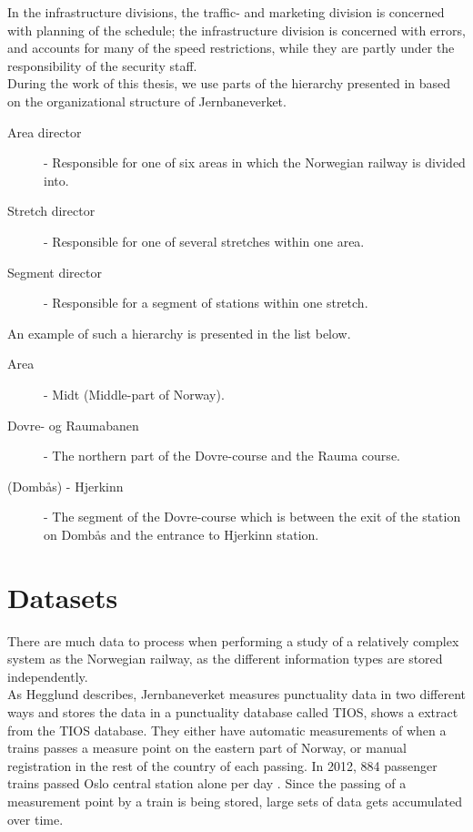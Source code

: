 In the infrastructure divisions, the traffic- and marketing division is
concerned with planning of the schedule; the infrastructure division is
concerned with errors, and accounts for many of the speed restrictions, while
they are partly under the responsibility of the security staff.\\


During the work of this thesis, we use parts of the hierarchy presented in 
 based on the organizational structure of Jernbaneverket.
\begin{description}
	\item [Area director] - Responsible for one of six areas in which the 
	Norwegian railway is divided into.
	\item [Stretch director] - Responsible for one of several stretches within 
	one area.
	\item [Segment director] - Responsible for a segment of stations within one stretch.
\end{description}

\bigskip\bigskip\bigskip
An example of such a hierarchy is presented in the list below.

\begin{description}
	\item [Area] - Midt (Middle-part of Norway).
	\item [Dovre- og Raumabanen] - The northern part of the Dovre-course and the
	Rauma course.
	\item [(Dombås) - Hjerkinn] - The segment of the Dovre-course which is 
	between the exit of the station on Dombås and the entrance to Hjerkinn
	station.
\end{description}


\section{Datasets} %
\label{sec:back_data_sets}
There are much data to process when performing a study of a relatively complex 
system as the Norwegian railway, as the different information types are stored
independently.\\

As Hegglund\cite[pp. 10-11]{hegglundPunklighetsdataIJernbanetraffik} describes,
Jernbaneverket measures punctuality data in two different ways and stores the
data in a punctuality database called TIOS,  shows a extract from the TIOS database. They either have automatic measurements of when a 
trains passes a measure point on the eastern part of Norway, or manual 
registration in the rest of the country of each passing. In 2012,  884 passenger trains passed Oslo central station alone per day \cite[p. 12]{jernbaneverketStatistikk}.
Since the passing of a measurement point by a train is being stored, large sets
of data gets accumulated over time.

